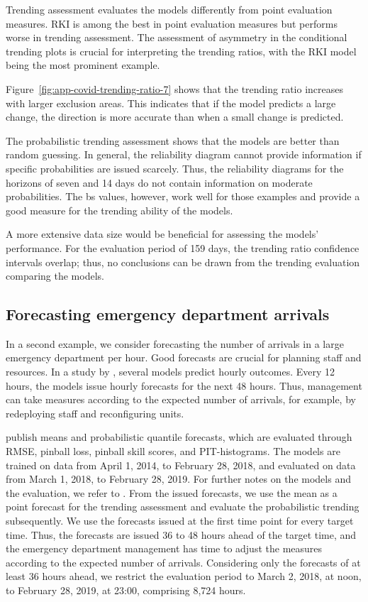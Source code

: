 \documentclass[pdflatex]{sn-jnl}
\theoremstyle{plain}%
\theoremstyle{definition}
\begin{document}
Trending assessment evaluates the models differently from point evaluation measures.
RKI is among the best in point evaluation measures but performs worse in trending assessment.
The assessment of asymmetry in the conditional trending plots is crucial for interpreting the trending ratios, with the RKI model being the most prominent example.

Figure~\ref{fig:app-covid-trending-ratio-7} shows that the trending ratio increases with larger exclusion areas.
This indicates that if the model predicts a large change, the direction is more accurate than when a small change is predicted.

The probabilistic trending assessment shows that the models are better than random guessing.
In general, the reliability diagram cannot provide information if specific probabilities are issued scarcely.
Thus, the reliability diagrams for the horizons of seven and 14 days do not contain information on moderate probabilities.
The \ac{bs} values, however, work well for those examples and provide a good measure for the trending ability of the models.

A more extensive data size would be beneficial for assessing the models' performance.
For the evaluation period of 159 days, the trending ratio confidence intervals overlap; thus, no conclusions can be drawn from the trending evaluation comparing the models.

\subsection{Forecasting emergency department arrivals}\label{sec:application-eda}

In a second example, we consider forecasting the number of arrivals in a large emergency department per hour.
Good forecasts are crucial for planning staff and resources.
In a study by \citet{Rostami-Tabar2023}, several models predict hourly outcomes.
Every 12 hours, the models issue hourly forecasts for the next 48 hours.
Thus, management can take measures according to the expected number of arrivals, for example, by redeploying staff and reconfiguring units.

\citet{Rostami-Tabar2023} publish means and probabilistic quantile forecasts, which are evaluated through RMSE, pinball loss, pinball skill scores, and PIT-histograms.
The models are trained on data from April 1, 2014, to February 28, 2018, and evaluated on data from March 1, 2018, to February 28, 2019.
For further notes on the models and the evaluation, we refer to \citet{Rostami-Tabar2023}.
From the issued forecasts, we use the mean as a point forecast for the trending assessment and evaluate the probabilistic trending subsequently.
We use the forecasts issued at the first time point for every target time.
Thus, the forecasts are issued 36 to 48 hours ahead of the target time, and the emergency department management has time to adjust the measures according to the expected number of arrivals.
Considering only the forecasts of at least 36 hours ahead, we restrict the evaluation period to March 2, 2018, at noon, to February 28, 2019, at 23:00, comprising 8,724 hours.
\end{document}

